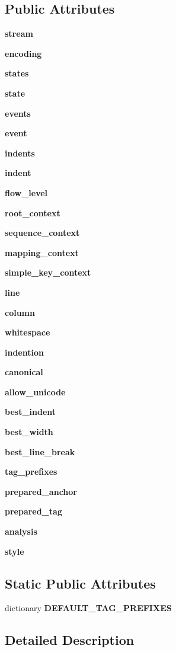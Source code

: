 \subsection*{Public Attributes}
\begin{CompactItemize}
\item 
{\bf stream}
\item 
{\bf encoding}
\item 
{\bf states}
\item 
{\bf state}
\item 
{\bf events}
\item 
{\bf event}
\item 
{\bf indents}
\item 
{\bf indent}
\item 
{\bf flow\_\-level}
\item 
{\bf root\_\-context}
\item 
{\bf sequence\_\-context}
\item 
{\bf mapping\_\-context}
\item 
{\bf simple\_\-key\_\-context}
\item 
{\bf line}
\item 
{\bf column}
\item 
{\bf whitespace}
\item 
{\bf indention}
\item 
{\bf canonical}
\item 
{\bf allow\_\-unicode}
\item 
{\bf best\_\-indent}
\item 
{\bf best\_\-width}
\item 
{\bf best\_\-line\_\-break}
\item 
{\bf tag\_\-prefixes}
\item 
{\bf prepared\_\-anchor}
\item 
{\bf prepared\_\-tag}
\item 
{\bf analysis}
\item 
{\bf style}
\end{CompactItemize}
\subsection*{Static Public Attributes}
\begin{CompactItemize}
\item 
dictionary {\bf DEFAULT\_\-TAG\_\-PREFIXES}
\end{CompactItemize}


\subsection{Detailed Description}


